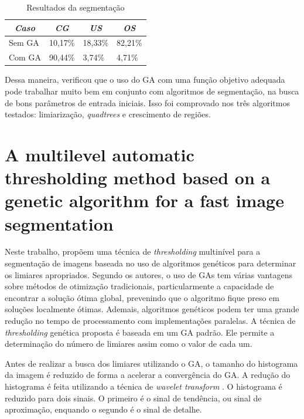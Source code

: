 \documentclass[12pt,oneside,a4paper,english,french,spanish,brazil,]{abntex2}
\begin{document}
\begin{table}
\centering
\caption{Resultados da segmentação}
\label{tab:TrCo_Matias_1}
\begin{tabular}{llll}
\hline
\multicolumn{1}{c}{\textit{\textbf{Caso}}} & \multicolumn{1}{c}{\textit{\textbf{CG}}} & \multicolumn{1}{c}{\textit{\textbf{US}}} & \multicolumn{1}{c}{\textit{\textbf{OS}}} \\ \hline
Sem GA                                     & 10,17\%                                  & 18,33\%                                  & 82,21\%                                  \\
Com GA                                     & 90,44\%                                  & 3,74\%                                   & 4,71\%                                   \\ \hline
\end{tabular}
\end{table}

Dessa maneira, \citet{matias:2007} verificou que o uso do GA com uma função objetivo adequada pode trabalhar muito bem em conjunto com algoritmos de segmentação, na busca de bons parâmetros de entrada iniciais. Isso foi comprovado nos três algoritmos testados: limiarização, \textit{quadtrees} e crescimento de regiões.

\section{A multilevel automatic thresholding method based on a genetic algorithm for a fast image segmentation}

Neste trabalho, \citet{hammouche:2008} propõem uma técnica de \textit{thresholding} multinível para a segmentação de imagens baseada no uso de algoritmos genéticos para determinar os limiares apropriados. Segundo os autores, o uso de GAs tem várias vantagens sobre métodos de otimização tradicionais, particularmente a capacidade de encontrar a solução ótima global, prevenindo que o algoritmo fique preso em soluções localmente ótimas. Ademais, algoritmos genéticos podem ter uma grande redução no tempo de processamento com implementações paralelas. A técnica de \textit{thresholding} genética proposta é baseada em um GA padrão. Ele permite a determinação do número de limiares assim como o valor de cada um. 

Antes de realizar a busca dos limiares utilizando o GA, o tamanho do histograma da imagem é reduzido de forma a acelerar a convergência do GA. A redução do histograma é feita utilizando a técnica de \textit{wavelet transform} \cite{kim:2003}. O histograma é reduzido para dois sinais. O primeiro é o sinal de tendência, ou sinal de aproximação, enquando o segundo é o sinal de detalhe.
\end{document}
